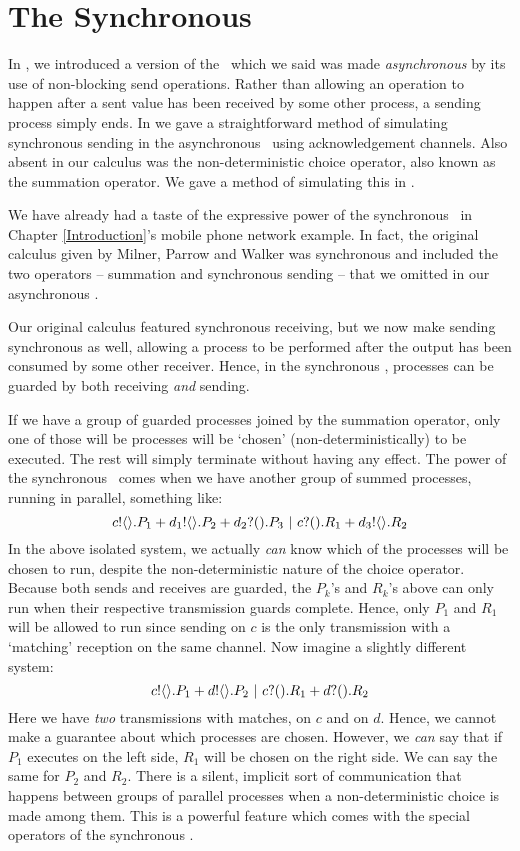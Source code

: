 \chapter{The Synchronous \Picalc}\label{sync_and_express}
In , we introduced a version of the \picalc\ which we said was made \emph{asynchronous} by its use of non-blocking send operations.  
Rather than allowing an operation to happen after a sent value has been received by some other process, a sending process simply ends.  
In  we gave a straightforward method of simulating synchronous sending in the asynchronous \picalc\ using acknowledgement channels.  
Also absent in our calculus was the non-deterministic choice operator, also known as the summation operator.  
We gave a method of simulating this in .

We have already had a taste of the expressive power of the synchronous \picalc\ in Chapter \ref{Introduction}'s mobile phone network example.  In fact, the original calculus given by Milner, Parrow and Walker was synchronous and included the two operators -- summation and synchronous sending -- that we omitted in our asynchronous \picalc.  

Our original calculus featured synchronous receiving, but we now make sending synchronous as well, allowing a process to be performed after the output has been consumed by some other receiver.  
Hence, in the synchronous \picalc, processes can be guarded by both receiving \emph{and} sending.  


If we have a group of guarded processes joined by the summation operator, only one of those will be processes will be `chosen' (non-deterministically) to be executed.  
The rest will simply terminate without having any effect.  
The power of the synchronous \picalc\ comes when we have another group of summed processes, running in parallel, something like: 
\[
	{c}!\langle{}\rangle.P_1 + {d_1}!\langle{}\rangle.P_2 + {d_2}?({}).P_3 \ |\  {c}?({}).R_1 + {d_3}!\langle{}\rangle.R_2
\]
In the above isolated system, we actually \emph{can} know which of the processes will be chosen to run, despite the non-deterministic nature of the choice operator.  
Because both sends and receives are guarded, the $P_k$'s and $R_k$'s above can only run when their respective transmission guards complete.  
Hence, only $P_1$ and $R_1$ will be allowed to run since sending on $c$ is the only transmission with a `matching' reception on the same channel.  
Now imagine a slightly different system:
\[
	{c}!\langle{}\rangle.P_1 + {d}!\langle{}\rangle.P_2 \ |\  {c}?({}).R_1 + {d}?({}).R_2
\]
Here we have \emph{two} transmissions with matches, on $c$ and on $d$.  
Hence, we cannot make a guarantee about which processes are chosen.  
However, we \emph{can} say that if $P_1$ executes on the left side, $R_1$ will be chosen on the right side.  
We can say the same for $P_2$ and $R_2$.  
There is a silent, implicit sort of communication that happens between groups of parallel processes when a non-deterministic choice is made among them.  
This is a powerful feature which comes with the special operators of the synchronous \picalc.  

